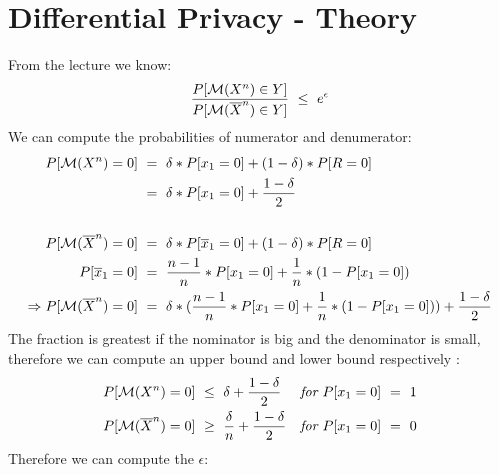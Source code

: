 \documentclass{report}
\begin{document}
	\section{Differential Privacy - Theory}
	\startsection
		From the lecture we know:
		\[
			\frac{P[\fancyletter{M}(X^n) \in Y]}{P[\fancyletter{M}(\overline{X}^n) \in Y]} \ \leq \ e^{\epsilon}
		\]
		We can compute the probabilities of numerator and denumerator:
		\begin{align*}
			P[\mathcal{M}(X^n) = 0 ] \ & = \ \delta * P[x_1 = 0] + (1-\delta) * P[R = 0] \\
			& = \ \delta * P[x_1 = 0] + \frac{1-\delta}{2} \\
			\\
			P[\mathcal{M}(\overline{X}^n) = 0 ] \ & = \ \delta * P[\overline{x}_1 = 0] + (1-\delta) * P[R = 0] \\
			P[\overline{x}_1 = 0] \ & = \ \frac{n-1}{n} * P[x_1 = 0] + \frac{1}{n} * (1 - P[x_1 = 0]) \\
			\Rightarrow P[\mathcal{M}(\overline{X}^n) = 0 ] \ & = \ \delta * (\frac{n-1}{n} * P[x_1 = 0] + \frac{1}{n} * (1 - P[x_1 = 0])) + \frac{1-\delta}{2}
		\end{align*}
		The fraction is greatest if the nominator is big and the denominator is small, therefore we can compute an upper bound and lower bound respectively :
		\begin{align*}
			P[\fancyletter{M}(X^n) = 0 ] \ & \leq \ \delta + \frac{1-\delta}{2} && \textit{for $P[x_1 = 0] \ = \ 1$} \\
			P[\fancyletter{M}(\overline{X}^n) = 0 ] \ & \geq \ \frac{\delta}{n} + \frac{1 - \delta}{2} && \textit{for $P[x_1 = 0] \ = \ 0$}
		\end{align*}
		Therefore we can compute the $\epsilon$:
\end{document}
